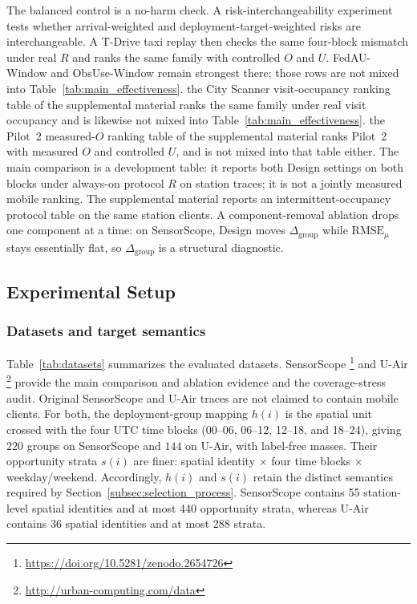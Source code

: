 \documentclass[letterpaper,journal]{IEEEtran}
\begin{document}
The balanced control is a no-harm check.  A risk-interchangeability experiment tests whether arrival-weighted and
deployment-target-weighted risks are interchangeable.  A T-Drive taxi
replay then checks the same four-block mismatch under real $R$ and ranks
the same family with controlled $O$ and $U$.  FedAU-Window and ObsUse-Window
remain strongest there; those rows are not mixed into
Table~\ref{tab:main_effectiveness}.
the City Scanner visit-occupancy ranking table of the supplemental material ranks the same family under real
visit occupancy and is likewise not mixed into
Table~\ref{tab:main_effectiveness}.
the Pilot~2 measured-$O$ ranking table of the supplemental material ranks Pilot~2 with measured
$O$ and controlled $U$, and is not mixed into that table either.
The main comparison is a development table: it reports both Design settings
on both blocks
under always-on protocol $R$ on station traces; it is not a jointly
measured mobile ranking.  The supplemental material reports an
intermittent-occupancy protocol table on the same station clients.  A
component-removal ablation drops one component at a time: on SensorScope,
Design moves $\Delta_{\mathrm{group}}$ while $\mathrm{RMSE}_{\mu}$ stays
essentially flat, so $\Delta_{\mathrm{group}}$ is a structural diagnostic.

\subsection{Experimental Setup}
\label{subsec:eval_setup}

\subsubsection{Datasets and target semantics}

Table~\ref{tab:datasets} summarizes the evaluated datasets.  SensorScope
\cite{ingelrest2010sensorscope,barrenetxea2019sensorscope}\footnote{\url{https://doi.org/10.5281/zenodo.2654726}}
and U-Air
\cite{zheng2013uair}\footnote{\url{http://urban-computing.com/data}}
provide the main comparison and ablation evidence and the coverage-stress audit.
Original SensorScope and U-Air traces are not claimed to contain mobile
clients.  For both, the deployment-group mapping $h(i)$ is the spatial unit
crossed with the four UTC time blocks (00--06, 06--12, 12--18, and 18--24),
giving $220$ groups on SensorScope and $144$ on U-Air, with label-free
masses.  Their opportunity strata $s(i)$ are finer: spatial identity
$\times$ four time blocks $\times$ weekday/weekend.
Accordingly, $h(i)$ and $s(i)$ retain the distinct semantics required by
Section~\ref{subsec:selection_process}.  SensorScope contains 55 station-level
spatial identities and at most 440 opportunity strata, whereas U-Air contains
36 spatial identities and at most 288 strata.
\end{document}
